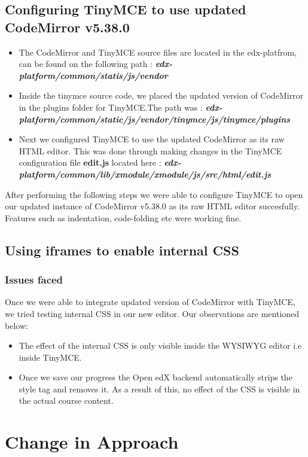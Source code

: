 \subsection{Configuring TinyMCE to use updated CodeMirror v5.38.0}
\begin{itemize}
\item The CodeMirror and TinyMCE source files are located in the edx-platfrom, can be found on
the following path : \textit{\textbf{edx-platform/common/statis/js/vendor}}
\item Inside the tinymce source code, we placed the updated version of CodeMirror in the plugins
folder for TinyMCE.\newline The path was :
\textit{\textbf{edx-platform/common/static/js/vendor/tinymce/js/tinymce/plugins}}
\item Next we configured TinyMCE to use the updated CodeMirror as its raw HTML editor. This
was done through making changes in the TinyMCE configuration file \textbf{edit.js} located here :\newline
\textbf{\textit{edx-platform/common/lib/xmodule/xmodule/js/src/html/edit.js}}
\end{itemize}
After performing the following steps we were able to configure TinyMCE to open our updated
instance of CodeMirror v5.38.0 as its raw HTML editor succesfully. Features such as indentation,
code-folding etc were working fine.

\subsection{Using iframes to enable internal CSS}
\subsubsection{Issues faced}
Once we were able to integrate updated version of CodeMirror with TinyMCE, we tried testing
internal CSS in our new editor. Our observations are mentioned below:
\begin{itemize}
\item  The effect of the internal CSS is only visible inside the WYSIWYG editor i.e inside
TinyMCE.
\item  Once we save our progress the Open edX backend automatically strips the style tag and
removes it. As a result of this, no effect of the CSS is visible in the actual course content.
\end{itemize}

\section{Change in Approach}

